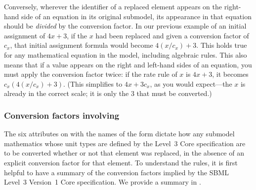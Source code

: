 Conversely, wherever the identifier of a replaced element appears on the
right-hand side of an equation in its original submodel, its appearance
in that equation should be \emph{divided} by the conversion factor.  In
our previous example of an initial assignment of $4x+3$, if the $x$ had
been replaced and given a conversion factor of $c_x$, that initial
assignment formula would become $4(x/c_x)+3$.  This holds true for any
mathematical equation in the model, including algebraic rules.  This
also means that if a value appears on the right and left-hand sides of
an equation, you must apply the conversion factor twice: if the rate
rule of $x$ is $4x+3$, it becomes $c_x(4(x/c_x) + 3)$.  (This
simplifies to $4x + 3c_x$, as you would expect---the $x$ is already in
the correct scale; it is only the 3 that must be converted.)



\subsubsection{Conversion factors involving }

The six attributes on \Submodel with the names of the form
 dictate how any submodel
mathematics whose unit types are defined by the Level~3 Core
specification are to be converted whether or not that element was
replaced, in the absence of an explicit conversion factor for that
element.  To understand the rules, it is first helpful to have a summary
of the conversion factors implied by the SBML Level~3 Version~1 Core
specification.  We provide a summary in .

